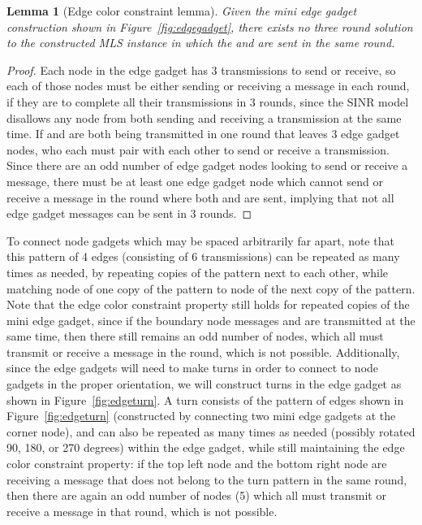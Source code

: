 \documentclass{article}
\newtheorem{lemma}{Lemma}
\begin{document}
\begin{lemma}[Edge color constraint lemma]
Given the mini edge gadget construction shown in Figure~\ref{fig:edgegadget}, there exists no three round solution to the constructed MLS instance in which the  and  are sent in the same round.
\end{lemma}
\begin{proof}
Each node in the edge gadget has 3 transmissions to send or receive, so each of those nodes must be either sending or receiving a message in each round, if they are to complete all their transmissions in 3 rounds, since the SINR model disallows any node from both sending and receiving a transmission at the same time.  If  and  are both being transmitted in one round that leaves 3 edge gadget nodes, who each must pair with each other to send or receive a transmission.  Since there are an odd number of edge gadget nodes looking to send or receive a message, there must be at least one edge gadget node which cannot send or receive a message in the round where both  and  are sent, implying that not all edge gadget messages can be sent in 3 rounds.
\end{proof}

To connect node gadgets which may be spaced arbitrarily far apart, note that this pattern of 4 edges (consisting of 6 transmissions) can be repeated as many times as needed, by repeating copies of the pattern next to each other, while matching node  of one copy of the pattern to node  of the next copy of the pattern.  Note that the edge color constraint property still holds for repeated copies of the mini edge gadget, since if the boundary node messages  and  are transmitted at the same time, then there still remains an odd number of nodes, which all must transmit or receive a message in the round, which is not possible.  Additionally, since the edge gadgets will need to make turns in order to connect to node gadgets in the proper orientation, we will construct turns in the edge gadget as shown in Figure~\ref{fig:edgeturn}.   A turn consists of the pattern of edges shown in Figure~\ref{fig:edgeturn} (constructed by connecting two mini edge gadgets at the corner node), and can also be repeated as many times as needed (possibly rotated 90, 180, or 270 degrees) within the edge gadget, while still maintaining the edge color constraint property: if the top left node and the bottom right node are receiving a message that does not belong to the turn pattern in the same round, then there are again an odd number of nodes (5) which all must transmit or receive a message in that round, which is not possible.
\end{document}
